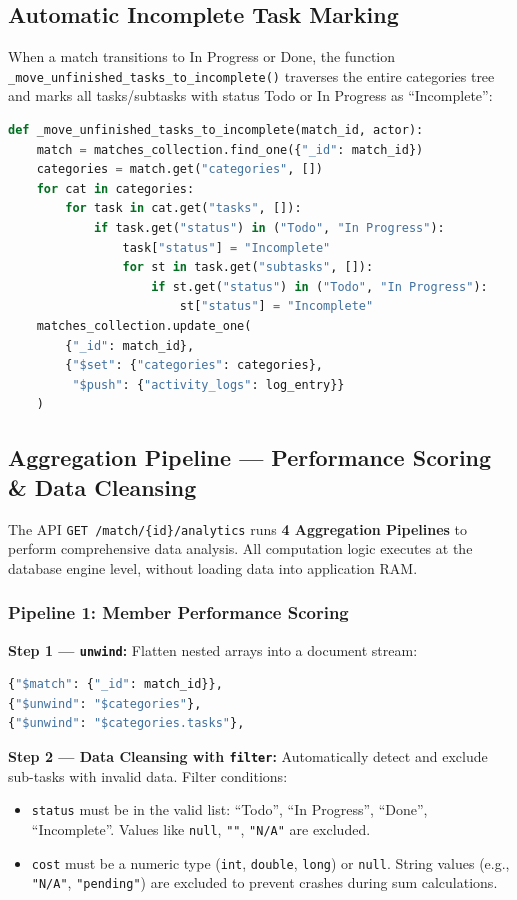 \documentclass[a4paper,12pt]{article}
\begin{document}
\subsection{Automatic Incomplete Task Marking}
When a match transitions to In Progress or Done, the function \texttt{\_move\_unfinished\_tasks\_to\_incomplete()} traverses the entire categories tree and marks all tasks/subtasks with status Todo or In Progress as ``Incomplete'':

\begin{lstlisting}[language=Python, caption=Automatically marking unfinished tasks]
def _move_unfinished_tasks_to_incomplete(match_id, actor):
    match = matches_collection.find_one({"_id": match_id})
    categories = match.get("categories", [])
    for cat in categories:
        for task in cat.get("tasks", []):
            if task.get("status") in ("Todo", "In Progress"):
                task["status"] = "Incomplete"
                for st in task.get("subtasks", []):
                    if st.get("status") in ("Todo", "In Progress"):
                        st["status"] = "Incomplete"
    matches_collection.update_one(
        {"_id": match_id},
        {"$set": {"categories": categories},
         "$push": {"activity_logs": log_entry}}
    )
\end{lstlisting}


\subsection{Aggregation Pipeline --- Performance Scoring \& Data Cleansing}

The API \texttt{GET /match/\{id\}/analytics} runs \textbf{4 Aggregation Pipelines} to perform comprehensive data analysis. All computation logic executes at the database engine level, without loading data into application RAM.

\subsubsection{Pipeline 1: Member Performance Scoring}

\textbf{Step 1 --- \texttt{unwind}:} Flatten nested arrays into a document stream:
\begin{lstlisting}[language=Python, caption=Unwind categories and tasks]
{"$match": {"_id": match_id}},
{"$unwind": "$categories"},
{"$unwind": "$categories.tasks"},
\end{lstlisting}

\textbf{Step 2 --- Data Cleansing with \texttt{filter}:} Automatically detect and exclude sub-tasks with invalid data. Filter conditions:
\begin{itemize}
    \item \texttt{status} must be in the valid list: ``Todo'', ``In Progress'', ``Done'', ``Incomplete''. Values like \texttt{null}, \texttt{""}, \texttt{"N/A"} are excluded.
    \item \texttt{cost} must be a numeric type (\texttt{int}, \texttt{double}, \texttt{long}) or \texttt{null}. String values (e.g., \texttt{"N/A"}, \texttt{"pending"}) are excluded to prevent crashes during sum calculations.
\end{itemize}
\end{document}
